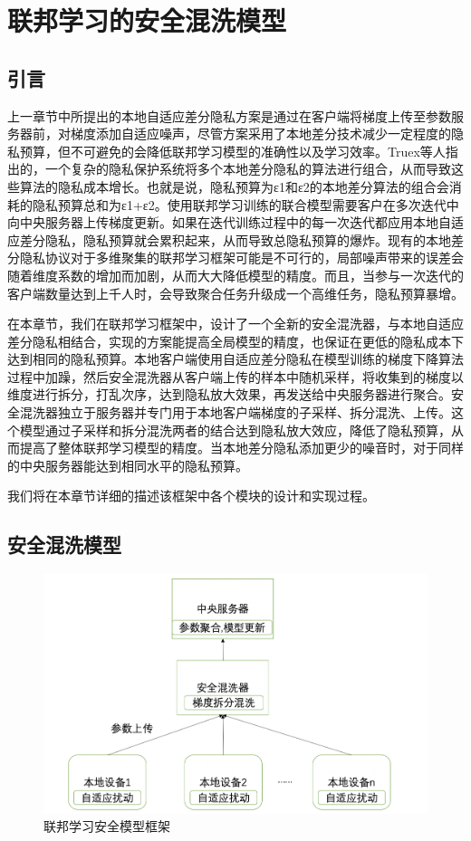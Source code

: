 \chapter{联邦学习的安全混洗模型}
\label{ch4}
\section{引言}
上一章节中所提出的本地自适应差分隐私方案是通过在客户端将梯度上传至参数服务器前，对梯度添加自适应噪声，尽管方案采用了本地差分技术减少一定程度的隐私预算，但不可避免的会降低联邦学习模型的准确性以及学习效率。Truex等人指出的，一个复杂的隐私保护系统将多个本地差分隐私的算法进行组合，从而导致这些算法的隐私成本增长。也就是说，隐私预算为ε1和ε2的本地差分算法的组合会消耗的隐私预算总和为ε1+ε2。使用联邦学习训练的联合模型需要客户在多次迭代中向中央服务器上传梯度更新。如果在迭代训练过程中的每一次迭代都应用本地自适应差分隐私，隐私预算就会累积起来，从而导致总隐私预算的爆炸。现有的本地差分隐私协议对于多维聚集的联邦学习框架可能是不可行的，局部噪声带来的误差会随着维度系数的增加而加剧，从而大大降低模型的精度。而且，当参与一次迭代的客户端数量达到上千人时，会导致聚合任务升级成一个高维任务，隐私预算暴增。

在本章节，我们在联邦学习框架中，设计了一个全新的安全混洗器，与本地自适应差分隐私相结合，实现的方案能提高全局模型的精度，也保证在更低的隐私成本下达到相同的隐私预算。本地客户端使用自适应差分隐私在模型训练的梯度下降算法过程中加躁，然后安全混洗器从客户端上传的样本中随机采样，将收集到的梯度以维度进行拆分，打乱次序，达到隐私放大效果，再发送给中央服务器进行聚合。安全混洗器独立于服务器并专门用于本地客户端梯度的子采样、拆分混洗、上传。这个模型通过子采样和拆分混洗两者的结合达到隐私放大效应，降低了隐私预算，从而提高了整体联邦学习模型的精度。当本地差分隐私添加更少的噪音时，对于同样的中央服务器能达到相同水平的隐私预算。

我们将在本章节详细的描述该框架中各个模块的设计和实现过程。

\section{安全混洗模型}
\begin{figure}[!hbt]
\centering
	\includegraphics[scale=0.4]{fig2/C4/shuffle模型}%
	\caption{联邦学习安全模型框架}
	\label{fig:联邦学习安全模型框架}	
\end{figure}

